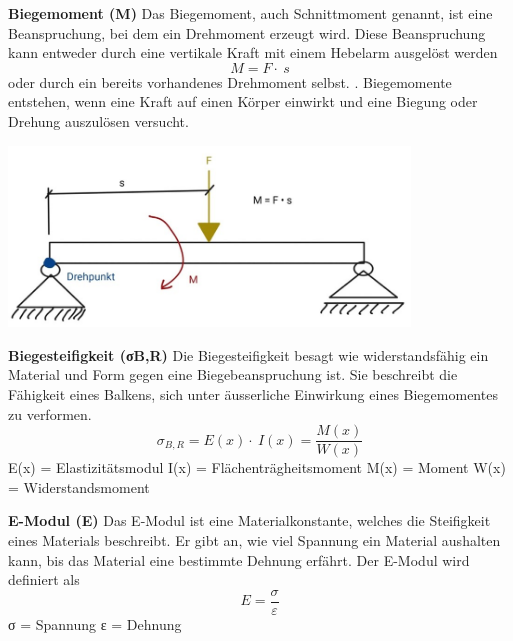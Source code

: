 \textbf{Biegemoment (M)}
Das Biegemoment, auch Schnittmoment genannt, ist eine Beanspruchung, bei dem ein Drehmoment erzeugt wird.
Diese Beanspruchung kann entweder durch eine vertikale Kraft mit einem Hebelarm ausgelöst werden
\begin{equation}
	M=
	F\cdot\ s
\end{equation}
\label{Formel für die Berechnung von Momenten}
oder durch ein bereits vorhandenes Drehmoment selbst.
. Biegemomente entstehen, wenn eine Kraft auf einen Körper einwirkt und eine Biegung oder Drehung auszulösen versucht.
\begin{center}
	\includegraphics[width=0.8\textwidth]{papers/balken/images/teil1/Biegemoment.jpg}
\end{center}
\label{Die Abbildung zeigt einen Balken, der von einer einzigen Last belastet wird, was zu auftretenden Momenten führt.}

\textbf{Biegesteifigkeit (σB,R)}
Die Biegesteifigkeit besagt wie widerstandsfähig ein Material und Form gegen eine Biegebeanspruchung ist.
Sie beschreibt die Fähigkeit eines Balkens, sich unter äusserliche Einwirkung eines Biegemomentes zu verformen.
\begin{equation}
	\sigma_{B,R}=
	E\left(x\right)\cdot\ I\left(x\right)=
	\frac{M(x)}{W(x)}
\end{equation}
\label{Formel für die Biegesteifigkeit einer Bauteils}
E(x) = Elastizitätsmodul
I(x) = Flächenträgheitsmoment
M(x) = Moment 
W(x) = Widerstandsmoment

\textbf{E-Modul (E)}
Das E-Modul ist eine Materialkonstante, welches die Steifigkeit eines Materials beschreibt.
Er gibt an, wie viel Spannung ein Material aushalten kann, bis das Material eine bestimmte Dehnung erfährt.
Der E-Modul wird definiert als
\begin{equation}
	E=
	\frac{\sigma}{\varepsilon}
\end{equation}
σ = Spannung
ε = Dehnung

